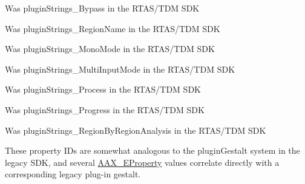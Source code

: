 \begin{DoxyRefList}
%
 Was plugin\+Strings\+\_\+\+Bypass in the RTAS/\+TDM SDK  
\item[Member \mbox{\hyperlink{a00524_a86f7310877399d9d4d2ea4863d472476ab33b745bc2c47f9c95bad0125ff6c816}{AAX\+\_\+e\+Plug\+In\+Strings\+\_\+\+Clip\+Name}} ]\label{a00880__porting_notes000017}%
%
 Was plugin\+Strings\+\_\+\+Region\+Name in the RTAS/\+TDM SDK  
\item[Member \mbox{\hyperlink{a00524_a86f7310877399d9d4d2ea4863d472476ace28c7a0863e1adef165d0f3b52a9660}{AAX\+\_\+e\+Plug\+In\+Strings\+\_\+\+Mono\+Mode}} ]\label{a00880__porting_notes000013}%
%
 Was plugin\+Strings\+\_\+\+Mono\+Mode in the RTAS/\+TDM SDK  
\item[Member \mbox{\hyperlink{a00524_a86f7310877399d9d4d2ea4863d472476a4e05ed47ae75ef3c99ed7b5599da6e53}{AAX\+\_\+e\+Plug\+In\+Strings\+\_\+\+Multi\+Input\+Mode}} ]\label{a00880__porting_notes000014}%
%
 Was plugin\+Strings\+\_\+\+Multi\+Input\+Mode in the RTAS/\+TDM SDK  
\item[Member \mbox{\hyperlink{a00524_a86f7310877399d9d4d2ea4863d472476a28ef93b11664703ce99624d99b2d163c}{AAX\+\_\+e\+Plug\+In\+Strings\+\_\+\+Process}} ]\label{a00880__porting_notes000019}%
%
 Was plugin\+Strings\+\_\+\+Process in the RTAS/\+TDM SDK  
\item[Member \mbox{\hyperlink{a00524_a86f7310877399d9d4d2ea4863d472476a2524774deef9e82058134126dc729a5a}{AAX\+\_\+e\+Plug\+In\+Strings\+\_\+\+Progress}} ]\label{a00880__porting_notes000018}%
%
 Was plugin\+Strings\+\_\+\+Progress in the RTAS/\+TDM SDK  
\item[Member \mbox{\hyperlink{a00524_a86f7310877399d9d4d2ea4863d472476ae3a832bfc597a707358610647b3f51c3}{AAX\+\_\+e\+Plug\+In\+Strings\+\_\+\+Region\+By\+Region\+Analysis}} ]\label{a00880__porting_notes000015}%
%
 Was plugin\+Strings\+\_\+\+Region\+By\+Region\+Analysis in the RTAS/\+TDM SDK  
\item[Member \mbox{\hyperlink{a00737_a13e384f22825afd3db6d68395b79ce0d}{AAX\+\_\+\+EProperty}} ]\label{a00880__porting_notes000039}%
%
 These property IDs are somewhat analogous to the plugin\+Gestalt system in the legacy SDK, and several \mbox{\hyperlink{a00737_a13e384f22825afd3db6d68395b79ce0d}{AAX\+\_\+\+EProperty}} values correlate directly with a corresponding legacy plug-\/in gestalt.


\end{DoxyRefList}
